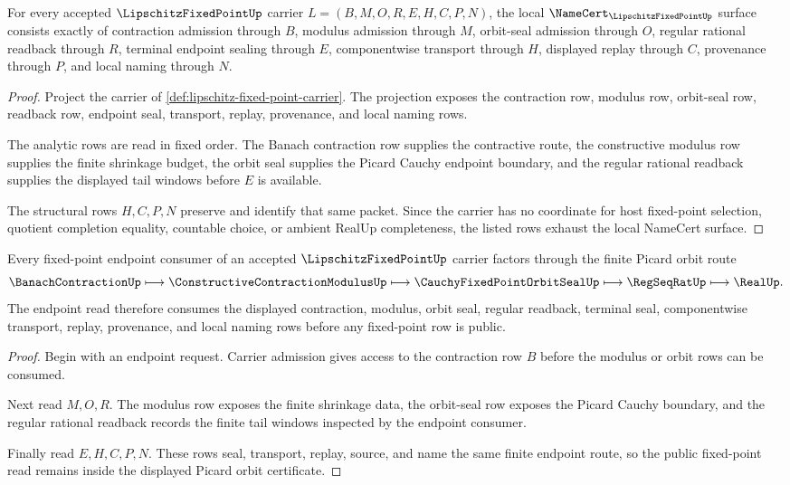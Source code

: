 \begin{theorem}
\label{thm:lipschitz-fixed-point-namecert-obligations}
For every accepted $\LipschitzFixedPointUp$ carrier $L=(B,M,O,R,E,H,C,P,N)$, the local $\NameCert_{\LipschitzFixedPointUp}$ surface consists exactly of contraction admission through $B$, modulus admission through $M$, orbit-seal admission through $O$, regular rational readback through $R$, terminal endpoint sealing through $E$, componentwise transport through $H$, displayed replay through $C$, provenance through $P$, and local naming through $N$.
\end{theorem}
\begin{proof}
Project the carrier of \autoref{def:lipschitz-fixed-point-carrier}. The projection exposes the contraction row, modulus row, orbit-seal row, readback row, endpoint seal, transport, replay, provenance, and local naming rows.

The analytic rows are read in fixed order. The Banach contraction row supplies the contractive route, the constructive modulus row supplies the finite shrinkage budget, the orbit seal supplies the Picard Cauchy endpoint boundary, and the regular rational readback supplies the displayed tail windows before $E$ is available.

The structural rows $H,C,P,N$ preserve and identify that same packet. Since the carrier has no coordinate for host fixed-point selection, quotient completion equality, countable choice, or ambient RealUp completeness, the listed rows exhaust the local NameCert surface.
\end{proof}

\begin{theorem}
\label{thm:lipschitz-fixed-point-picard-orbit-cauchy}
Every fixed-point endpoint consumer of an accepted $\LipschitzFixedPointUp$ carrier factors through the finite Picard orbit route
$$
\BanachContractionUp \longmapsto
\ConstructiveContractionModulusUp \longmapsto
\CauchyFixedPointOrbitSealUp \longmapsto
\RegSeqRatUp \longmapsto
\RealUp .
$$
The endpoint read therefore consumes the displayed contraction, modulus, orbit seal, regular readback, terminal seal, componentwise transport, replay, provenance, and local naming rows before any fixed-point row is public.
\end{theorem}
\begin{proof}
Begin with an endpoint request. Carrier admission gives access to the contraction row $B$ before the modulus or orbit rows can be consumed.

Next read $M,O,R$. The modulus row exposes the finite shrinkage data, the orbit-seal row exposes the Picard Cauchy boundary, and the regular rational readback records the finite tail windows inspected by the endpoint consumer.

Finally read $E,H,C,P,N$. These rows seal, transport, replay, source, and name the same finite endpoint route, so the public fixed-point read remains inside the displayed Picard orbit certificate.
\end{proof}

